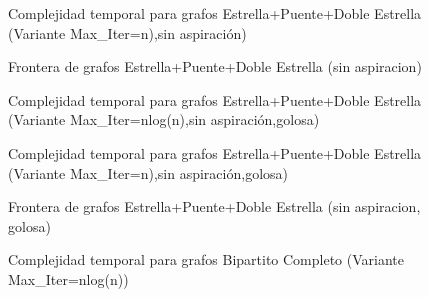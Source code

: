 \begin{figure}[H]
    \centering
    \fontsize{8}{10}\selectfont
    \resizebox{0.8\textwidth}{!}{}
    \caption{Complejidad temporal para grafos Estrella+Puente+Doble Estrella (Variante Max\_Iter=n),sin aspiraci\'on)}
\end{figure}

\begin{figure}[H]
    \centering
    \fontsize{8}{10}\selectfont
    \resizebox{0.8\textwidth}{!}{}
    \caption{Frontera de grafos Estrella+Puente+Doble Estrella (sin aspiracion)}
\end{figure}

\begin{figure}[H]
    \centering
    \fontsize{8}{10}\selectfont
    \resizebox{0.8\textwidth}{!}{}
    \caption{Complejidad temporal para grafos Estrella+Puente+Doble Estrella (Variante Max\_Iter=nlog(n),sin aspiraci\'on,golosa)}
\end{figure}

\begin{figure}[H]
    \centering
    \fontsize{8}{10}\selectfont
    \resizebox{0.8\textwidth}{!}{}
    \caption{Complejidad temporal para grafos Estrella+Puente+Doble Estrella (Variante Max\_Iter=n),sin aspiraci\'on,golosa)}
\end{figure}

\begin{figure}[H]
    \centering
    \fontsize{8}{10}\selectfont
    \resizebox{0.8\textwidth}{!}{}
    \caption{Frontera de grafos Estrella+Puente+Doble Estrella (sin aspiracion, golosa)}
\end{figure}

\begin{figure}[H]
    \centering
    \fontsize{8}{10}\selectfont
    \resizebox{0.8\textwidth}{!}{}
    \caption{Complejidad temporal para grafos Bipartito Completo (Variante Max\_Iter=nlog(n))}
\end{figure}

